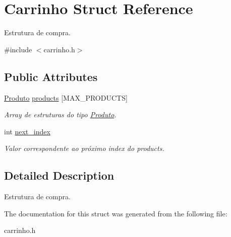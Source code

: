 \hypertarget{structCarrinho}{}\section{Carrinho Struct Reference}
\label{structCarrinho}


Estrutura de compra.  




{\ttfamily \#include $<$carrinho.\+h$>$}

\subsection*{Public Attributes}
\begin{DoxyCompactItemize}
\item 
\mbox{\label{structCarrinho_ad53cf3711e763edfed6d0bb5b7601c79}} 
\hyperlink{structProduto}{Produto} \hyperlink{structCarrinho_ad53cf3711e763edfed6d0bb5b7601c79}{products} \mbox{[}M\+A\+X\+\_\+\+P\+R\+O\+D\+U\+C\+TS\mbox{]}
\begin{DoxyCompactList}\small\item\em Array de estruturas do tipo \hyperlink{structProduto}{Produto}. \end{DoxyCompactList}\item 
\mbox{\label{structCarrinho_a3fbcae9c5da15876079084d9cccb34f4}} 
int \hyperlink{structCarrinho_a3fbcae9c5da15876079084d9cccb34f4}{next\+\_\+index}
\begin{DoxyCompactList}\small\item\em Valor correspondente ao próximo index do {\ttfamily products}. \end{DoxyCompactList}\end{DoxyCompactItemize}


\subsection{Detailed Description}
Estrutura de compra. 

The documentation for this struct was generated from the following file\+:\begin{DoxyCompactItemize}
\item 
carrinho.\+h\end{DoxyCompactItemize}
